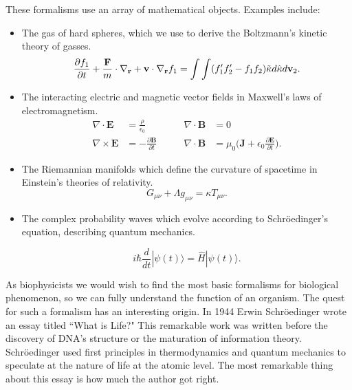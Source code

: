 
These formalisms use an array of mathematical objects. Examples include:
\begin{itemize}
\item The gas of hard spheres, which we use to derive the Boltzmann's kinetic theory of gasses.  
\begin{equation}
	\label{hard_spheres}
	\frac{\partial f_1}{\partial t} + \frac{\bold{F}}{m}\cdot\nabla_\bold{r} + \bold{v} \cdot \nabla_\bold{r} f_1 =  \int \int (f'_1f'_2 - f_1 f_2) \tilde \kappa d \hat \kappa d \bold{v}_2.
\end{equation}

\item The interacting electric and magnetic vector fields in Maxwell's laws of electromagnetism.
\begin{equation}
	\begin{aligned}
		\nabla \cdot  \mathbf{E} &= \frac{\rho}{\epsilon_0} \qquad & \nabla \cdot  \mathbf{B} &= 0 \\
		\nabla \times  \mathbf{E} &= -\frac{\partial \mathbf{B}}{\partial t} \qquad &  \nabla \cdot  \mathbf{B} &= \mu_0 \big(\mathbf{J} + \epsilon_0 \frac{\partial \mathbf{E} } {\partial t }\big).
	\end{aligned}
\end{equation}

\item The Riemannian manifolds which define the curvature of spacetime in Einstein's theories of relativity.
\begin{equation}
	G_{\mu \nu} + \Lambda g_{\mu \nu} = \kappa T_{\mu \nu}.
\end{equation}

\item The complex probability waves which evolve according to Schr\"oedinger's equation, describing quantum mechanics. 

\begin{equation}
	i \hbar \frac{d}{dt} | \psi (t) \rangle = \hat {H} | \psi (t) \rangle .
\end{equation}
\end{itemize}

As biophysicists we would wish to find the most basic formalisms for biological phenomenon, so we can fully understand the function of an organism. The quest for such a formalism has an interesting origin. In 1944 Erwin Schr\"oedinger wrote an essay titled ``What is Life?" This remarkable work was written before the discovery of DNA's structure or the maturation of information theory. Schr\"oedinger used first principles in thermodynamics and quantum mechanics to speculate at the nature of life at the atomic level. The most remarkable thing about this essay is how much the author got right. 

